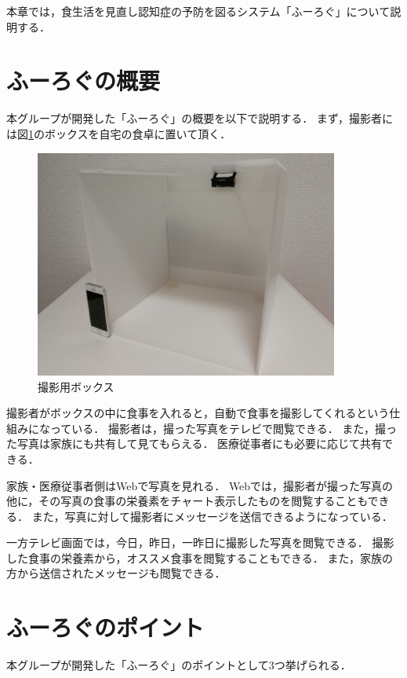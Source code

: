 \documentclass[../report]{subfiles}
\begin{document}
本章では，食生活を見直し認知症の予防を図るシステム「ふーろぐ」について説明する．

\section{ふーろぐの概要}
本グループが開発した「ふーろぐ」の概要を以下で説明する．
まず，撮影者には図\ref{fig:5_box}のボックスを自宅の食卓に置いて頂く．

\begin{figure}[htbp]
    \begin{center}
        \includegraphics[width=10cm]{imgs/5_box.jpg}
        \caption{撮影用ボックス}
        \label{fig:5_box}
    \end{center}
\end{figure}

撮影者がボックスの中に食事を入れると，自動で食事を撮影してくれるという仕組みになっている．
撮影者は，撮った写真をテレビで閲覧できる．
また，撮った写真は家族にも共有して見てもらえる．
医療従事者にも必要に応じて共有できる．

家族・医療従事者側はWebで写真を見れる．
Webでは，撮影者が撮った写真の他に，その写真の食事の栄養素をチャート表示したものを閲覧することもできる．
また，写真に対して撮影者にメッセージを送信できるようになっている．

一方テレビ画面では，今日，昨日，一昨日に撮影した写真を閲覧できる．
撮影した食事の栄養素から，オススメ食事を閲覧することもできる．
また，家族の方から送信されたメッセージも閲覧できる．


\section{ふーろぐのポイント}
本グループが開発した「ふーろぐ」のポイントとして3つ挙げられる．
\end{document}

